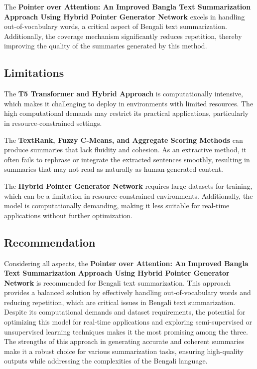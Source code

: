 \documentclass[12pt]{report}
\begin{document}
The \textbf{Pointer over Attention: An Improved Bangla Text Summarization Approach Using Hybrid Pointer Generator Network} \cite{dhar2021pointer} excels in handling out-of-vocabulary words, a critical aspect of Bengali text summarization. Additionally, the coverage mechanism significantly reduces repetition, thereby improving the quality of the summaries generated by this method.

\subsection*{Limitations}
The \textbf{T5 Transformer and Hybrid Approach} \cite{hasib2023bengali} is computationally intensive, which makes it challenging to deploy in environments with limited resources. The high computational demands may restrict its practical applications, particularly in resource-constrained settings.

The \textbf{TextRank, Fuzzy C-Means, and Aggregate Scoring Methods} \cite{rahman2019bengali} can produce summaries that lack fluidity and cohesion. As an extractive method, it often fails to rephrase or integrate the extracted sentences smoothly, resulting in summaries that may not read as naturally as human-generated content.

The \textbf{Hybrid Pointer Generator Network} \cite{dhar2021pointer} requires large datasets for training, which can be a limitation in resource-constrained environments. Additionally, the model is computationally demanding, making it less suitable for real-time applications without further optimization.

\subsection*{Recommendation}
Considering all aspects, the \textbf{Pointer over Attention: An Improved Bangla Text Summarization Approach Using Hybrid Pointer Generator Network} \cite{dhar2021pointer} is recommended for Bengali text summarization. This approach provides a balanced solution by effectively handling out-of-vocabulary words and reducing repetition, which are critical issues in Bengali text summarization. Despite its computational demands and dataset requirements, the potential for optimizing this model for real-time applications and exploring semi-supervised or unsupervised learning techniques makes it the most promising among the three. The strengths of this approach in generating accurate and coherent summaries make it a robust choice for various summarization tasks, ensuring high-quality outputs while addressing the complexities of the Bengali language.
\end{document}

